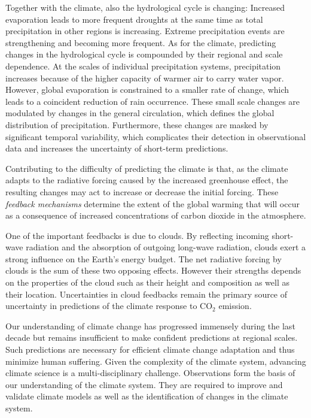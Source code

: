 Together with the climate, also the hydrological cycle is changing: Increased
evaporation leads to more frequent droughts at the same time as total
precipitation in other regions is increasing. Extreme precipitation events are
strengthening and becoming more frequent. As for the climate, predicting changes
in the hydrological cycle is compounded by their regional and scale dependence.
At the scales of individual precipitation systems, precipitation increases
because of the higher capacity of warmer air to carry water vapor. However,
global evaporation is constrained to a smaller rate of change, which leads to a
coincident reduction of rain occurrence. These small scale changes are modulated
by changes in the general circulation, which defines the global distribution of
precipitation. Furthermore, these changes are masked by significant temporal
variability, which complicates their detection in observational data and
increases the uncertainty of short-term predictions.

Contributing to the difficulty of predicting the climate is that, as the climate
adapts to the radiative forcing caused by the increased greenhouse effect, the
resulting changes may act to increase or decrease the initial forcing.
These \textit{feedback mechanisms} determine the extent of the global warming
that will occur as a consequence of increased concentrations of carbon dioxide in the
atmosphere.

One of the important feedbacks is due to clouds. By reflecting incoming
short-wave radiation and the absorption of outgoing long-wave radiation, clouds
exert a strong influence on the Earth's energy budget. The net radiative
forcing by clouds is the sum of these two opposing effects. However their
strengths depends on the properties of the cloud such as their height
and composition as well as their location. Uncertainties in cloud
feedbacks remain the primary source of uncertainty in predictions of
the climate response to CO$_2$ emission.

Our understanding of climate change has progressed immensely during the last
decade but remains insufficient to make confident predictions at regional
scales. Such predictions are necessary for efficient climate change adaptation
and thus minimize human suffering. Given the complexity of the climate system,
advancing climate science is a multi-disciplinary challenge. Observations form
the basis of our understanding of the climate system. They are required to
improve and validate climate models as well as the identification of changes
in the climate system.


